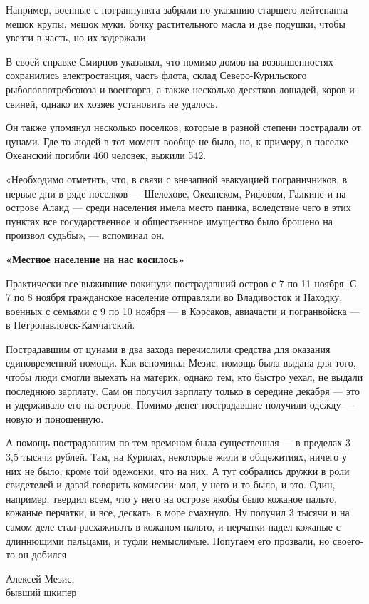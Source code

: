 Например, военные с погранпункта забрали по указанию старшего лейтенанта мешок крупы, мешок муки, бочку растительного масла и две подушки, чтобы увезти в часть, но их задержали.

В своей справке Смирнов указывал, что помимо домов на возвышенностях сохранились электростанция, часть флота, склад Северо-Курильского рыболовпотребсоюза и военторга, а также несколько десятков лошадей, коров и свиней, однако их хозяев установить не удалось.

Он также упомянул несколько поселков, которые в разной степени пострадали от цунами. Где-то людей в тот момент вообще не было, но, к примеру, в поселке Океанский погибли 460 человек, выжили 542.

«Необходимо отметить, что, в связи с внезапной эвакуацией пограничников, в первые дни в ряде поселков --- Шелехове, Океанском, Рифовом, Галкине и на острове Алаид --- среди населения имела место паника, вследствие чего в этих пунктах все государственное и общественное имущество было брошено на произвол судьбы», --- вспоминал он.


\textbf{«Местное население на нас косилось»}

Практически все выжившие покинули пострадавший остров с 7 по 11 ноября. С 7 по 8 ноября гражданское население отправляли во Владивосток и Находку, военных с семьями с 9 по 10 ноября --- в Корсаков, авиачасти и погранвойска --- в Петропавловск-Камчатский.

Пострадавшим от цунами в два захода перечислили средства для оказания единовременной помощи. Как вспоминал Мезис, помощь была выдана для того, чтобы люди смогли выехать на материк, однако тем, кто быстро уехал, не выдали последнюю зарплату. Сам он получил зарплату только в середине декабря --- это и удерживало его на острове. Помимо денег пострадавшие получили одежду --- новую и поношенную.

\begin{fancyquotes}
    А помощь пострадавшим по тем временам была существенная --- в пределах 3-3,5 тысячи рублей. Там, на Курилах, некоторые жили в общежитиях, ничего у них не было, кроме той одежонки, что на них. А тут собрались дружки в роли свидетелей и давай говорить комиссии: мол, у него и то было, и это. Один, например, твердил всем, что у него на острове якобы было кожаное пальто, кожаные перчатки, и все, дескать, в море смахнуло. Ну получил 3 тысячи и на самом деле стал расхаживать в кожаном пальто, и перчатки надел кожаные с длиннющими пальцами, и туфли немыслимые. Попугаем его прозвали, но своего-то он добился\\

    \begin{flushright}
        Алексей Мезис,
        \\
        бывший шкипер
    \end{flushright}
\end{fancyquotes}

